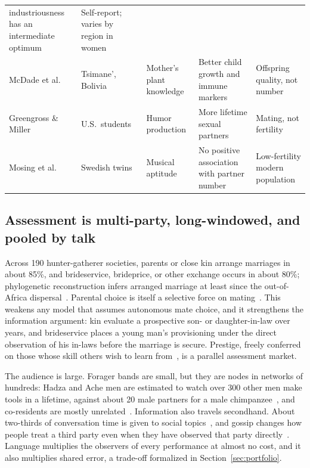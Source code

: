 \begin{table}[t]
\begin{tabularx}{\textwidth}{@{}P{0.155\textwidth}P{0.15\textwidth}P{0.175\textwidth}LP{0.20\textwidth}@{}}
industriousness has an intermediate optimum & Self-report; varies by region in women\\
McDade et al.~\cite{mcdade2007} & Tsimane', Bolivia & Mother's plant knowledge & Better child growth and immune markers &
Offspring quality, not number\\
Greengross \& Miller~\cite{greengross2011} & U.S.\ students & Humor production & More lifetime sexual partners & Mating, not
fertility\\
Mosing et al.~\cite{mosing2015} & Swedish twins & Musical aptitude & No positive association with partner number &
Low-fertility modern population\\
\bottomrule
\end{tabularx}
\end{table}

\subsection{Assessment is multi-party, long-windowed, and pooled by talk}

Across 190 hunter-gatherer societies, parents or close kin arrange marriages in about 85\%, and brideservice, brideprice, or
other exchange occurs in about 80\%; phylogenetic reconstruction infers arranged marriage at least since the out-of-Africa
dispersal~\cite{walker2011}. Parental choice is itself a selective force on mating~\cite{apostolou2007}. This weakens any model
that assumes autonomous mate choice, and it strengthens the information argument: kin evaluate a prospective son- or
daughter-in-law over years, and brideservice places a young man's provisioning under the direct observation of his in-laws
before the marriage is secure. Prestige, freely conferred on those whose skill others wish to learn from~\cite{henrich2001},
is a parallel assessment market.

The audience is large. Forager bands are small, but they are nodes in networks of hundreds: Hadza and Ache men are
estimated to watch over 300 other men make tools in a lifetime, against about 20 male partners for a male
chimpanzee~\cite{hill2014}, and co-residents are mostly unrelated~\cite{hill2011}. Information also travels secondhand. About
two-thirds of conversation time is given to social topics~\cite{dunbar2004}, and gossip changes how people treat a third
party even when they have observed that party directly~\cite{sommerfeld2007}. Language multiplies the observers of every
performance at almost no cost, and it also multiplies shared error, a trade-off formalized in Section~\ref{sec:portfolio}.


